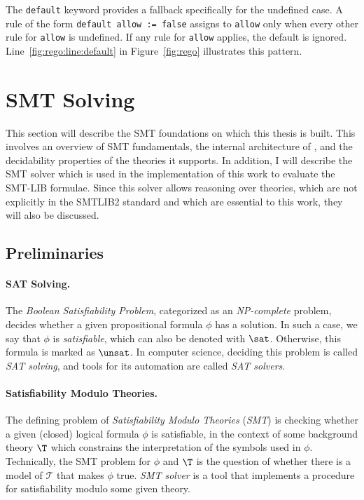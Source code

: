 The \texttt{default} keyword provides a fallback specifically for the undefined case.
A rule of the form \texttt{default allow := false} assigns \false to \texttt{allow} only when every other rule for \texttt{allow} is undefined.
If any rule for \texttt{allow} applies, the default is ignored.
Line~\ref{fig:rego:line:default} in Figure~\ref{fig:rego} illustrates this pattern.

\section{SMT Solving}
\label{sec:smt}


This section will describe the SMT foundations on which this thesis is built.
This involves an overview of SMT fundamentals, the internal architecture of \ziii, and the decidability properties of the theories it supports.
In addition, I will describe the \ziii SMT solver which is used in the implementation of this work to evaluate the SMT-LIB formulae.
Since this solver allows reasoning over theories, which are not explicitly in the SMTLIB2 standard and which are essential to this work, they will also be discussed.

\subsection{Preliminaries}

\paragraph{SAT Solving.}
The \emph{Boolean Satisfiability Problem}, categorized as an \emph{NP-complete} problem, decides whether a given propositional formula $\phi$ has a solution.
In such a case, we say that $\phi$ is \emph{satisfiable}, which can also be denoted with $\sat$.
Otherwise, this formula is marked as $\unsat$.
In computer science, deciding this problem is called \emph{SAT solving}, and tools for its automation are called \emph{SAT solvers}.

\paragraph{Satisfiability Modulo Theories.}
The defining problem of \emph{Satisfiability Modulo Theories} (\emph{SMT}) is checking whether a given (closed) logical formula $\phi$ is satisfiable, in the context of some background theory $\T$ which constrains the interpretation of the symbols used in $\phi$\cite{smt:sm-theories, smt:first-ord-logic}.
Technically, the SMT problem for $\phi$ and $\T$ is the question of whether there is a model of $\mathcal{T}$ that makes $\phi$ true.
\emph{SMT solver} is a tool that implements a procedure for satisfiability modulo some given theory. 

